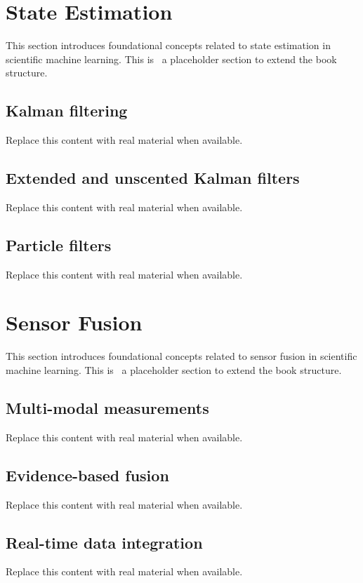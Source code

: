 
\section{State Estimation}
This section introduces foundational concepts related to state estimation in scientific machine learning. This is~\cite{abdulmaksoudTransformerBasedSensorFusion2025} a placeholder section to extend the book structure.

\subsection{Kalman filtering}
Replace this content with real material when available.

\subsection{Extended and unscented Kalman filters}
Replace this content with real material when available.

\subsection{Particle filters}
Replace this content with real material when available.

\section{Sensor Fusion}
This section introduces foundational concepts related to sensor fusion in scientific machine learning. This is~\cite{abdulmaksoudTransformerBasedSensorFusion2025} a placeholder section to extend the book structure.

\subsection{Multi-modal measurements}
Replace this content with real material when available.

\subsection{Evidence-based fusion}
Replace this content with real material when available.

\subsection{Real-time data integration}
Replace this content with real material when available.

